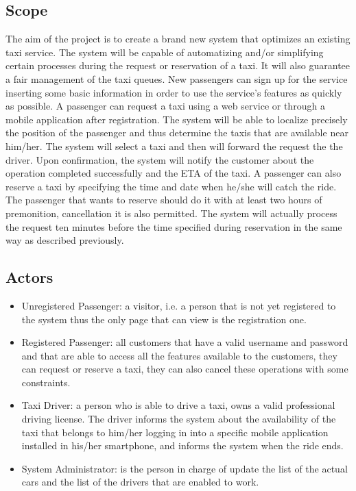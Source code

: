 \documentclass[a4paper,12pt]{article}%
\begin{document}
\subsection{Scope}
The aim of the project is to create a brand new system that optimizes an 
existing taxi service.
The system will be capable of automatizing  and/or simplifying certain 
processes during the request or reservation of a taxi.
It will also guarantee a fair management of the taxi queues.
New passengers can sign up for the service inserting some basic information in order to use the service's features as quickly as possible.
A passenger can request a taxi using a web service or through a mobile
application after registration. The system will be able to localize precisely the position
of the passenger and thus determine the taxis that are available near
him/her. The system will select a taxi and then will forward the request the the driver.
Upon confirmation, the system will notify the customer about the operation completed successfully and the ETA of the taxi. A passenger can also reserve a taxi by specifying the time and date when he/she will catch the ride.
The passenger that wants to reserve should do it with at least two hours of premonition, cancellation it is also permitted. The system will actually process the request ten minutes before the time specified during reservation in the same way as described previously.

\subsection{Actors}
\begin{itemize}
\item Unregistered Passenger: a visitor, i.e. a person that is not yet registered to the system thus the only page that can view is the registration one.
\item Registered Passenger: all customers that have a valid username and password and that are able to access all the features available to the customers, they can request or reserve a taxi, they can also cancel these operations with some constraints.
\item Taxi Driver: a person who is able to drive a taxi, owns a valid 
professional driving license. The driver informs the system about the availability of the
taxi that belongs to him/her logging in into a specific mobile application installed in his/her smartphone, and informs the system when the ride ends. 
\item System Administrator: is the person in charge of update the list of the actual cars and the list of the drivers that are enabled to work.
\end{itemize}
\end{document}
